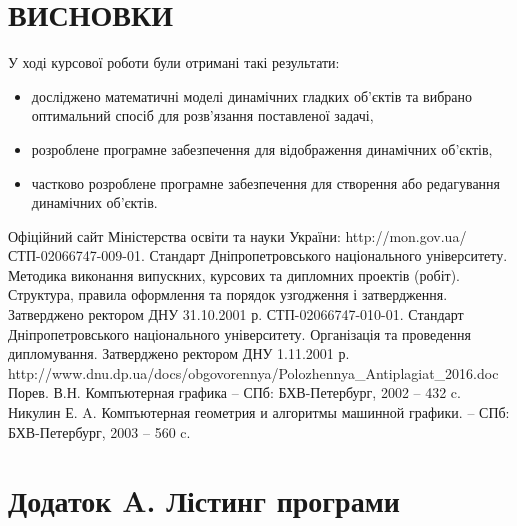 \documentclass[14pt,a4paper]{extarticle}
\theoremstyle{definition}
\renewcommand{\[}{\begin{singlespace}\begin{equation*}}
\renewcommand{\]}{\end{equation*}\end{singlespace}}
\begin{document}



\section*{ВИСНОВКИ}
У ході курсової роботи були отримані такі результати:

\begin{itemize}
\item досліджено математичні моделі динамічних гладких об'єктів та вибрано оптимальний спосіб для розв'язання поставленої задачі,
\item розроблене програмне забезпечення для відображення динамічних об'єктів,
\item частково розроблене програмне забезпечення для створення або редагування динамічних об'єктів.
\end{itemize}

\begin{thebibliography}{9}
\bibitem{} Офіційний сайт Міністерства освіти та науки України: http://mon.gov.ua/
\bibitem{} СТП-02066747-009-01. Стандарт Дніпропетровського національного університету. Методика виконання випускних, курсових та дипломних проектів (робіт). Структура, правила оформлення та порядок узгодження і затвердження. Затверджено ректором ДНУ 31.10.2001 р.
\bibitem{} СТП-02066747-010-01. Стандарт Дніпропетровського національного університету. Організація та проведення дипломування. Затверджено ректором ДНУ 1.11.2001 р.
\bibitem{} http://www.dnu.dp.ua/docs/obgovorennya/Polozhennya\_Antiplagiat\_2016.doc
 Порев. В.Н. Компъютерная графика -- СПб: БХВ-Петербург, 2002 -- 432 c.
 Никулин Е. A. Компъютерная геометрия и алгоритмы машинной графики. -- СПб: БХВ-Петербург, 2003 -- 560 c.
\end{thebibliography}

\section*{Додаток A. Лістинг програми}
\tiny
\end{document}
